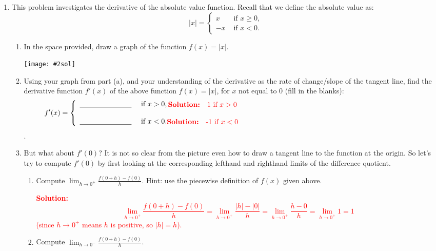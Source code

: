 \documentclass[letterpaper,11pt]{article}
\newcommand{\sol}[2]{\begin{minipage}[c][#1]{\linewidth}{\textcolor{red}{\textbf{Solution:}}\quad \textcolor{red}{#2}}\end{minipage}}
\newcommand{\fsol}[2]{\texttt{[image: \#2sol]}}
\newcommand{\sol}[2]{\begin{minipage}[c][#1]{\linewidth}{\vfill}\end{minipage}}
\newcommand{\fsol}[2]{\texttt{[image: \#2]}}
\begin{document}
\begin{enumerate}
\newpage

\item  This problem investigates the derivative of the absolute value function.  Recall that we define the absolute value as:
\begin{displaymath}
   |x| = \left\{
     \begin{array}{ll}
       x & \mbox{ if } x\geq 0,\\
	-x & \mbox{ if } x<0.
     \end{array}
   \right.
\end{displaymath}
	\begin{enumerate}
	\item In the space provided, draw a graph of the function $f(x)=|x|$.
\begin{center}
\fsol{.6}{fig4a}
\end{center} 

\item Using your graph from part (a), and your understanding of the derivative as the rate of change/slope of the tangent line, find the derivative function $f'(x)$ of the above function $f(x)=|x|$, for $x$ not equal to $0$  (fill in the blanks):
\begin{displaymath}
  f'(x) = \left\{
     \begin{array}{ll}
      \underline{\hskip1in} & \mbox{ if } x> 0, \sol{0 in}{1 if $x>0$}\\\\
	 \underline{\hskip1in}& \mbox{ if } x<0. \sol{0 in}{-1 if $x<0$}
     \end{array}
   \right.
\end{displaymath}.

\item But what about $f'(0)$?  
	It is not so clear from the picture even how to draw a tangent line to the function at the origin.
	So let's try to compute $f'(0)$ by first looking at the corresponding lefthand and righthand limits of the difference quotient. 
\begin{enumerate}
\item Compute $\lim_{h\rightarrow 0^+}\frac{f(0+h)-f(0)}{h}$.  Hint:  use the piecewise definition of $f(x)$ given above.

\sol{1 in}{
$$\lim_{h\rightarrow 0^+}\frac{f(0+h)-f(0)}{h}=\lim_{h\rightarrow 0^+}\frac{|h|-|0|}{h}=\lim_{h\rightarrow 0^+}\frac{h-0}{h}=\lim_{h\rightarrow 0^+}1=1$$(since $h\to 0^+$ means $h$ is positive, so $|h|=h$).
}

\item  Compute $\lim_{h\rightarrow 0^-}\frac{f(0+h)-f(0)}{h}$. 


\end{enumerate}
\end{enumerate}
\end{enumerate}
\end{document}
